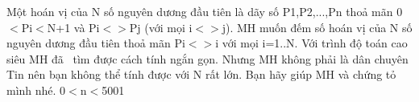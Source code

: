 Một hoán vị của N số nguyên dương đầu tiên là dãy số P1,P2,...,Pn thoả mãn 0$<$Pi$<$N+1 và Pi$<$$>$Pj (với mọi i$<$$>$j). MH muốn đếm số hoán vị của N số nguyên dương đầu tiên thoả mãn Pi$<$$>$i với mọi i=1..N. Với trình độ toán cao siêu MH đã  tìm được cách tính ngắn gọn. Nhưng MH không phải là dân chuyên Tin nên bạn không thể tính được với N rất lớn. Bạn hãy giúp MH và chứng tỏ mình nhé.
0$<$n$<$5001